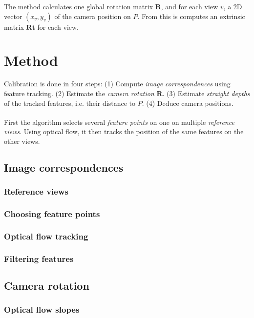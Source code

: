 \documentclass{scrreprt}
\newcommand{\matr}[1]{\mathbf{#1}}
\begin{document}
The method calculates one global rotation matrix $\matr{R}$, and for each view $v$, a 2D vector $(x_v, y_v)$ of the camera position on $P$. From this is computes an extrinsic matrix $\matr{Rt}$ for each view.
 
\chapter{Method}
Calibration is done in four steps: (1) Compute \emph{image correspondences} using feature tracking. (2) Estimate the \emph{camera rotation} $\matr{R}$. (3) Estimate \emph{straight depths} of the tracked features, i.e. their distance to $P$. (4) Deduce camera positions.
\\ \\
First the algorithm selects several \emph{feature points} on one on multiple \emph{reference views}. Using optical flow, it then tracks the position of the same features on the other views.
 
 
\section{Image correspondences}

\subsection{Reference views}

\subsection{Choosing feature points}

\subsection{Optical flow tracking}

\subsection{Filtering features}


\section{Camera rotation}

\subsection{Optical flow slopes}
\end{document}

